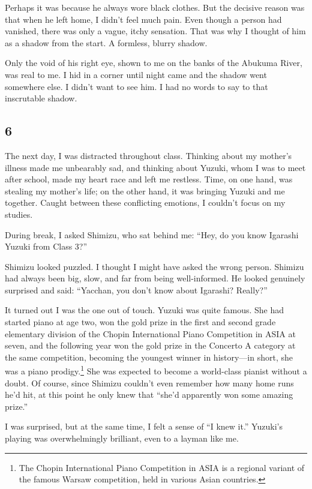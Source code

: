 \documentclass[
    a4paper,
    12pt,
    twoside,
    openany,
    UTF8,
    fontset=windows
]{ctexbook}
\begin{document}
Perhaps it was because he always wore black clothes. But the decisive reason was that when he left home, I didn't feel much pain. Even though a person had vanished, there was only a vague, itchy sensation. That was why I thought of him as a shadow from the start. A formless, blurry shadow.

Only the void of his right eye, shown to me on the banks of the Abukuma River, was real to me. I hid in a corner until night came and the shadow went somewhere else. I didn't want to see him. I had no words to say to that inscrutable shadow.


\subsection*{6}

The next day, I was distracted throughout class. Thinking about my mother's illness made me unbearably sad, and thinking about Yuzuki, whom I was to meet after school, made my heart race and left me restless. Time, on one hand, was stealing my mother's life; on the other hand, it was bringing Yuzuki and me together. Caught between these conflicting emotions, I couldn't focus on my studies.

During break, I asked Shimizu, who sat behind me: ``Hey, do you know Igarashi Yuzuki from Class 3?''

Shimizu looked puzzled. I thought I might have asked the wrong person. Shimizu had always been big, slow, and far from being well-informed. He looked genuinely surprised and said: ``Yacchan, you don't know about Igarashi? Really?''

It turned out I was the one out of touch. Yuzuki was quite famous. She had started piano at age two, won the gold prize in the first and second grade elementary division of the Chopin International Piano Competition in ASIA at seven, and the following year won the gold prize in the Concerto A category at the same competition, becoming the youngest winner in history---in short, she was a piano prodigy.\footnote{The Chopin International Piano Competition in ASIA is a regional variant of the famous Warsaw competition, held in various Asian countries.} She was expected to become a world-class pianist without a doubt. Of course, since Shimizu couldn't even remember how many home runs he'd hit, at this point he only knew that ``she'd apparently won some amazing prize.''

I was surprised, but at the same time, I felt a sense of ``I knew it.'' Yuzuki's playing was overwhelmingly brilliant, even to a layman like me.
\end{document}
